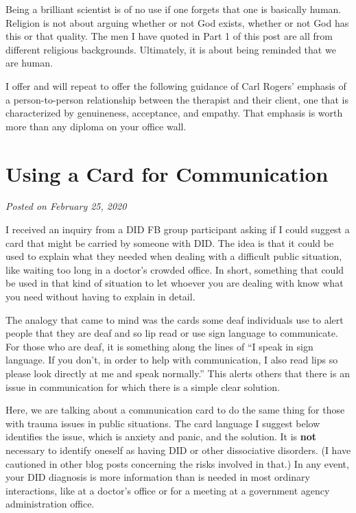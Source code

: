 \documentclass[]{book}
\begin{document}
Being a brilliant scientist is of no use if one forgets that one is basically human. Religion is not about arguing whether or not God exists, whether or not God has this or that quality. The men I have quoted in Part 1 of this post are all from different religious backgrounds. Ultimately, it is about being reminded that we are human.

I offer and will repeat to offer the following guidance of Carl Rogers' emphasis of a person-to-person relationship between the therapist and their client, one that is characterized by genuineness, acceptance, and empathy. That emphasis is worth more than any diploma on your office wall.

\hypertarget{using-a-card-for-communication}{%
\section{Using a Card for Communication}\label{using-a-card-for-communication}}

\emph{Posted on February 25, 2020}

I received an inquiry from a DID FB group participant asking if I could suggest a card that might be carried by someone with DID. The idea is that it could be used to explain what they needed when dealing with a difficult public situation, like waiting too long in a doctor's crowded office. In short, something that could be used in that kind of situation to let whoever you are dealing with know what you need without having to explain in detail.

The analogy that came to mind was the cards some deaf individuals use to alert people that they are deaf and so lip read or use sign language to communicate. For those who are deaf, it is something along the lines of ``I speak in sign language. If you don't, in order to help with communication, I also read lips so please look directly at me and speak normally.'' This alerts others that there is an issue in communication for which there is a simple clear solution.

Here, we are talking about a communication card to do the same thing for those with trauma issues in public situations. The card language I suggest below identifies the issue, which is anxiety and panic, and the solution. It is \textbf{not} necessary to identify oneself as having DID or other dissociative disorders. (I have cautioned in other blog posts concerning the risks involved in that.) In any event, your DID diagnosis is more information than is needed in most ordinary interactions, like at a doctor's office or for a meeting at a government agency administration office.
\end{document}
